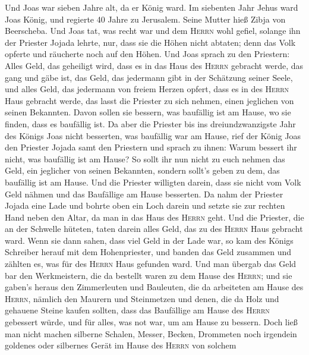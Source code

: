  Und Joas war sieben Jahre alt, da er König ward.
 Im siebenten Jahr Jehus ward Joas König, und regierte 40
Jahre zu Jerusalem. Seine Mutter hieß Zibja von Beerscheba.
 Und Joas tat, was recht war und dem \textsc{Herrn} wohl
gefiel, solange ihn der Priester Jojada lehrte,  nur, dass
sie die Höhen nicht abtaten; denn das Volk opferte und räucherte noch
auf den Höhen.  Und Joas sprach zu den Priestern: Alles
Geld, das geheiligt wird, dass es in das Haus des \textsc{Herrn}
gebracht werde, das gang und gäbe ist, das Geld, das jedermann gibt in
der Schätzung seiner Seele, und alles Geld, das jedermann von freiem
Herzen opfert, dass es in des \textsc{Herrn} Haus gebracht werde,
 das lasst die Priester zu sich nehmen, einen jeglichen
von seinen Bekannten. Davon sollen sie bessern, was baufällig ist am
Hause, wo sie finden, dass es baufällig ist.  Da aber die
Priester bis ins dreiundzwanzigste Jahr des Königs Joas nicht besserten,
was baufällig war am Hause,  rief der König Joas den
Priester Jojada samt den Priestern und sprach zu ihnen: Warum bessert
ihr nicht, was baufällig ist am Hause? So sollt ihr nun nicht zu euch
nehmen das Geld, ein jeglicher von seinen Bekannten, sondern sollt's
geben zu dem, das baufällig ist am Hause.  Und die
Priester willigten darein, dass sie nicht vom Volk Geld nähmen und das
Baufällige am Hause besserten.  Da nahm der Priester
Jojada eine Lade und bohrte oben ein Loch darein und setzte sie zur
rechten Hand neben den Altar, da man in das Haus des \textsc{Herrn}
geht. Und die Priester, die an der Schwelle hüteten, taten darein alles
Geld, das zu des \textsc{Herrn} Haus gebracht ward.  Wenn
sie dann sahen, dass viel Geld in der Lade war, so kam des Königs
Schreiber herauf mit dem Hohenpriester, und banden das Geld zusammen und
zählten es, was für des \textsc{Herrn} Haus gefunden ward.
 Und man übergab das Geld bar den Werkmeistern, die da
bestellt waren zu dem Hause des \textsc{Herrn}; und sie gaben's heraus
den Zimmerleuten und Bauleuten, die da arbeiteten am Hause des
\textsc{Herrn},  nämlich den Maurern und Steinmetzen und
denen, die da Holz und gehauene Steine kaufen sollten, dass das
Baufällige am Hause des \textsc{Herrn} gebessert würde, und für alles,
was not war, um am Hause zu bessern.  Doch ließ man nicht
machen silberne Schalen, Messer, Becken, Drommeten noch irgendein
goldenes oder silbernes Gerät im Hause des \textsc{Herrn} von solchem

